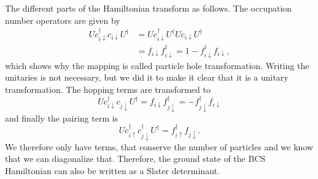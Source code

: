\documentclass[../../../main.tex]{subfiles}
\begin{document}
The different parts of the Hamiltonian transform as follows. The occupation number operators are given by
\begin{align*}
U c_{i\downarrow}^{\dagger} c_{i\downarrow} U^{\dagger}
&=U c_{i\downarrow}^{\dagger} U^{\dagger} U c_{i\downarrow} U^{\dagger}\\
&= f_{i\downarrow} f_{i\downarrow}^{\dagger}
=1-f_{i\downarrow}^{\dagger} f_{i\downarrow} ,
\end{align*}
which shows why the mapping is called particle hole transformation. Writing the unitaries is not necessary, but we did it to make it clear that it is a unitary transformation. The hopping terms are transformed to
\[
U c_{i\downarrow}^{\dagger} c_{j\downarrow} U^{\dagger}
=f_{i\downarrow} f_{j\downarrow}^{\dagger}
=-f_{j\downarrow}^{\dagger} f_{i\downarrow}
\]
and finally the pairing term is
\[
U c_{i\uparrow}^{\dagger} c_{j\downarrow}^{\dagger} U^{\dagger}
=f_{i\uparrow}^{\dagger} f_{j\downarrow} .
\]
We therefore only have terms, that conserve the number of particles and we know that we can diagonalize that. Therefore, the ground state of the BCS Hamiltonian can also be written as a Slater determinant.
\end{document}
